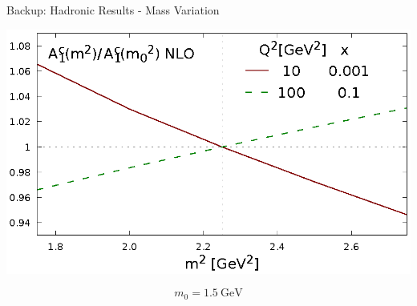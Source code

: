 \begin{frame}{Backup: Hadronic Results - Mass Variation}
\begin{center}
\includegraphics[width=.75\textwidth]{img/A1-m2}
\end{center}
\[m_0=\SI{1.5}{\GeV}\]
\end{frame}

